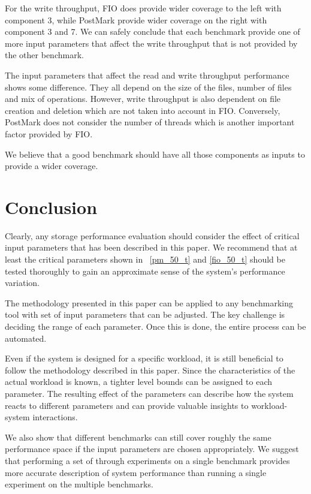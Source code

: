 For the write throughput, FIO does provide wider coverage to the left with component 3, while PostMark provide wider coverage on the right with component 3 and 7. We can safely conclude that each benchmark provide one of more input parameters that affect the write throughput that is not provided by the other benchmark. 

The input parameters that affect the read and write throughput performance shows some difference. They all depend on the size of the files, number of files and mix of operations. However, write throughput is also dependent on file creation and deletion which are not taken into account in FIO. Conversely, PostMark does not consider the number of threads which is another important factor provided by FIO. 

We believe that a good benchmark should have all those components as inputs to provide a wider coverage. 

\section{Conclusion}
Clearly, any storage performance evaluation should consider the effect of critical input parameters that has been described in this paper. We recommend that at least the critical parameters shown in \tablename~\ref{pm_50_t} and \ref{fio_50_t} should be tested thoroughly to gain an approximate sense of the system's performance variation.

The methodology presented in this paper can be applied to any benchmarking tool with set of input parameters that can be adjusted. The key challenge is deciding the range of each parameter. Once this is done, the entire process can be automated. 

Even if the system is designed for a specific workload, it is still beneficial to follow the methodology described in this paper. Since the characteristics of the actual workload is known, a tighter level bounds can be assigned to each parameter. The resulting effect of the parameters can describe how the system reacts to different parameters and can provide valuable insights to workload-system interactions. 

We also show that different benchmarks can still cover roughly the same performance space if the input parameters are chosen appropriately. We suggest that performing a set of through experiments on a single benchmark provides more accurate description of system performance than running a single experiment on the multiple benchmarks. 

